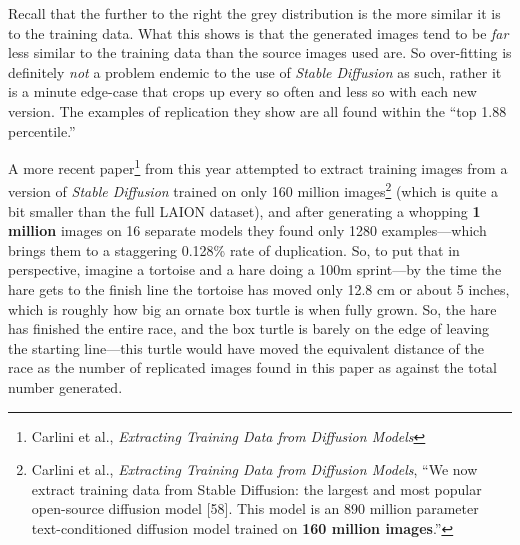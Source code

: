 \documentclass[11pt]{article}
\begin{document}
Recall that the further to the right the grey distribution is the more similar it is to the training data. What this shows is that the generated images tend to be \emph{far} less similar to the training data than the source images used are. So over-fitting is definitely \emph{not} a problem endemic to the use of \emph{Stable Diffusion} as such, rather it is a minute edge-case that crops up every so often and less so with each new version. The examples of replication they show are all found within the ``top 1.88 percentile.''

A more recent paper\footnote{Carlini et al., \emph{Extracting Training Data from Diffusion Models}} from this year attempted to extract training images from a version of \emph{Stable Diffusion} trained on only 160 million images\footnote{Carlini et al., \emph{Extracting Training Data from Diffusion Models}, ``We now extract training data from Stable Diffusion: the largest and most popular open-source diffusion model [58]. This model is an 890 million parameter text-conditioned diffusion model trained on \textbf{160 million images}.''} (which is quite a bit smaller than the full LAION dataset), and after generating a whopping \textbf{1 million} images on 16 separate models they found only 1280 examples---which brings them to a staggering 0.128\% rate of duplication. So, to put that in perspective, imagine a tortoise and a hare doing a 100m sprint---by the time the hare gets to the finish line the tortoise has moved only 12.8 cm or about 5 inches, which is roughly how big an ornate box turtle is when fully grown. So, the hare has finished the entire race, and the box turtle is barely on the edge of leaving the starting line---this turtle would have moved the equivalent distance of the race as the number of replicated images found in this paper as against the total number generated.
\end{document}
